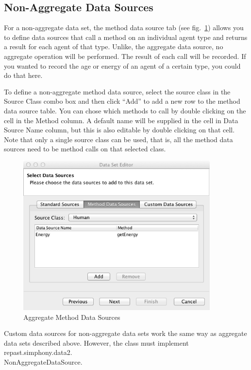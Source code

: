 \documentclass[11pt]{amsart}
\begin{document}
\subsection{Non-Aggregate Data Sources}
For a non-aggregate data set, the method data source tab (see fig.~\ref{fig:non-agg_method}) allows you to define data sources that call a method on an individual agent type and returns a result for each agent of that type. Unlike, the aggregate data source, no aggregate operation will be performed. The result of each call will be recorded. If you wanted to record the age or energy of an agent of a certain type, you could do that here.

To define a non-aggregate method data source, select the source class in the Source Class combo box and then click ``Add'' to add a new row to the method data source table. You can chose which methods to call by double clicking on the cell in the Method column. A default name will be supplied in the cell in Data Source Name column, but this is also editable by double clicking on that cell. Note that only a single source class can be used, that is, all the method data sources need to be method calls on that selected class. 

\begin{figure}[h]
\begin{center}
\vspace{.2in}
\centerline {
\includegraphics[width=4in]{images/non-agg_method.png}
}
\caption{Aggregate Method Data Sources}
\label{fig:non-agg_method}
\end{center}
\end{figure}

Custom data sources for non-aggregate data sets work the same way as aggregate data sets described above. However, the class must implement repast.simphony.data2.\\NonAggregateDataSource. 
\end{document}
